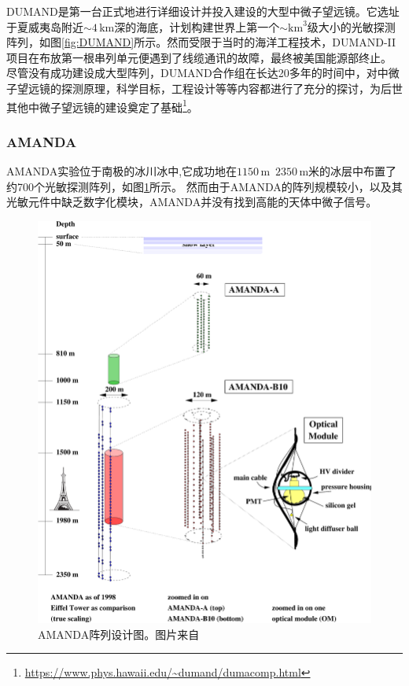 DUMAND\cite{DUMAND:1992}是第一台正式地进行详细设计并投入建设的大型中微子望远镜。它选址于夏威夷岛附近$\sim 4 \,\mathrm{km}$深的海底，计划构建世界上第一个$\sim\mathrm{km}^3$级大小的光敏探测阵列，如图\ref{fig:DUMAND}所示。然而受限于当时的海洋工程技术，DUMAND-II项目在布放第一根串列单元便遇到了线缆通讯的故障，最终被美国能源部终止\cite{Telescope_history:2019}。
尽管没有成功建设成大型阵列，DUMAND合作组在长达20多年的时间中，对中微子望远镜的探测原理，科学目标，工程设计等等内容都进行了充分的探讨，为后世其他中微子望远镜的建设奠定了基础\footnote{\url{https://www.phys.hawaii.edu/~dumand/dumacomp.html}}。

\subsubsection*{AMANDA}

AMANDA\cite{AMANDA:1999}实验位于南极的冰川冰中,它成功地在$1150\,\mathrm{m}$~$2350\,\mathrm{m}$米的冰层中布置了约700个光敏探测阵列，如图\ref{fig:AMANDA}所示。
然而由于AMANDA的阵列规模较小，以及其光敏元件中缺乏数字化模块，AMANDA并没有找到高能的天体中微子信号\cite{AMANDA_neutrino_search:2007}。

\begin{figure}[htb]
    \centering
    \includegraphics[width=0.75\linewidth]{img/AMANDA.pdf}
    \caption{AMANDA阵列设计图。图片来自\parencite{AMANDA:1999}}
    \label{fig:AMANDA}
\end{figure}

